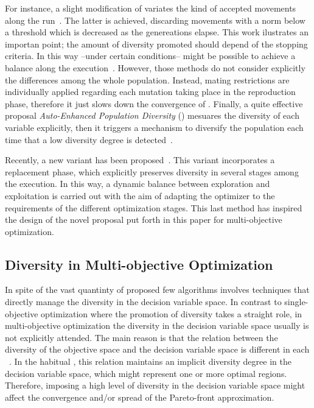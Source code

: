 For instance, a slight modification of \DE{} variates the kind of accepted movements along the run~\cite{montgomery2012simple}.
%
The latter is achieved, discarding movements with a norm below a threshold which is decreased as the genereations elapse.
%
This work ilustrates an importan point; the amount of diversity promoted should depend of the stopping criteria.
%
In this way --under certain conditions-- might be possible to achieve a balance along the execution~\cite{chen2015review, piad2015evolution}.
%
However, those methods do not consider explicitly the differences among the whole population.
%
Instead, mating restrictions are individually applied regarding each mutation taking place in the reproduction phase, therefore it just slows down the convergence of \DE{}.
%
Finally, a quite effective proposal \textit{Auto-Enhanced Population Diversity} (\AEPD{}) mesuares the diversity of each variable explicitly, then it triggers a mechanism to diversify the population each time that a low diversity degree is detected~\cite{yang2014differential}.
%

Recently, a new \DE{} variant has been proposed~\cite{castillo2019differential}.
%
This variant incorporates a replacement phase, which explicitly preserves diversity in several stages among the execution.
%
In this way, a dynamic balance between exploration and exploitation is carried out with the aim of adapting the optimizer to the requirements of the different optimization stages.
%
This last method has inspired the design of the novel proposal put forth in this paper for multi-objective optimization.


\subsection{Diversity in Multi-objective Optimization}\label{MOEAs:Diversity}

In spite of the vast quantinty of proposed \MOEAS{} few algorithms involves techniques that directly manage the diversity in the decision variable space.
%
In contrast to single-objective optimization where the promotion of diversity takes a straight role, in multi-objective optimization the diversity in the decision variable space usually is not explicitly attended.
%
The main reason is that the relation between the diversity of the objective space and the decision variable space is different in each \MOP{}~\cite{shir2009enhancing}.
%
In the habitual \MOPS{}, this relation maintains an implicit diversity degree in the decision variable space, which might represent one or more optimal regions.
%
Therefore, imposing a high level of diversity in the decision variable space might affect the convergence and/or spread of the Pareto-front approximation.
%


